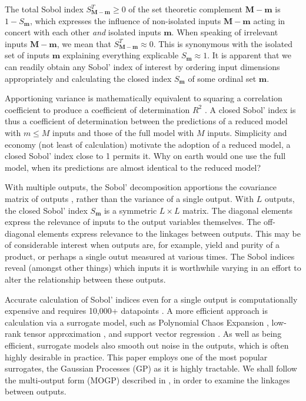 \documentclass[preprint,12pt]{elsarticle}
\newcommand*{\x}{\times}
\newcommand*{\mi}[1]{\mathbf{#1}}
\begin{document}
The total Sobol index $S^{T}_{\mi{M-m}} \geq 0$ of the set theoretic complement $\mi{M-m}$ is $1-S_{\mi{m}}$, which expresses the influence of non-isolated inputs $\mi{M-m}$ acting in concert with each other \emph{and} isolated inputs $\mi{m}$. When speaking of irrelevant inputs $\mi{M-m}$, we mean that $S^{T}_{\mi{M-m}} \approx 0$. This is synonymous with the isolated set of inputs $\mi{m}$ explaining everything explicable $S_{\mi{m}}\approx 1$.
It is apparent that we can readily obtain any Sobol' index of interest by ordering input dimensions appropriately and calculating the closed index $S_{\mi{m}}$ of some ordinal set $\mi{m}$.

Apportioning variance is mathematically equivalent to squaring a correlation coefficient to produce a coefficient of determination $R^{2}$ \cite{Chicco2021}. A closed Sobol' index is thus a coefficient of determination between the predictions of a reduced model with $m\leq M$ inputs and those of the full model with $M$ inputs. Simplicity and economy (not least of calculation) motivate the adoption of a reduced model, a closed Sobol' index close to 1 permits it. Why on earth would one use the full model, when its predictions are almost identical to the reduced model?

With multiple outputs, the Sobol' decomposition apportions the covariance matrix of outputs \cite{Gamboa.etal2013}, rather than the variance of a single output. With $L$ outputs, the closed Sobol' index $S_{\mi{m}}$ is a symmetric $L\x L$ matrix. The diagonal elements express the relevance of inputs to the output variables themselves. The off-diagonal elements express relevance to the linkages between outputs. This may be of considerable interest when outputs are, for example, yield and purity of a product, or perhaps a single outut measured at various times. The Sobol indices reveal (amongst other things) which inputs it is worthwhile varying in an effort to alter the relationship between these outputs.

Accurate calculation of Sobol' indices even for a single output is computationally expensive and requires 10,000+ datapoints \cite{Lamoureux.etal2014}. A more efficient approach is calculation via a surrogate model, such as Polynomial Chaos Expansion \cite{Ghanem.Spanos1997,Xiu.Karniadakis2002,Xiu2010}, low-rank tensor approximation \cite{Chevreuil.etal2015,Konakli.Sudret2016}, and support vector regression \cite{Cortes.Vapnik1995}. As well as being efficient, surrogate models also smooth out noise in the outputs, which is often highly desirable in practice. This paper employs one of the most popular surrogates, the Gaussian Processes (GP) \cite{Sacks.etal1989, Rasmussen.Williams2005} as it is highly tractable. We shall follow the multi-output form (MOGP) described in \cite{Alvarez.etal2011}, in order to examine the linkages between outputs. 
\end{document}
